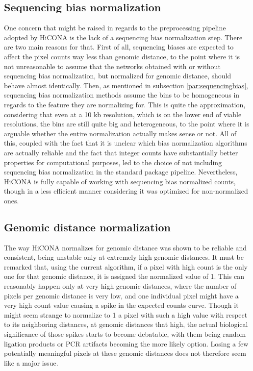 \subsection{Sequencing bias normalization}
One concern that might be raised in regards to the preprocessing pipeline adopted by HiCONA is the lack of a sequencing bias normalization step. There are two main reasons for that. First of all, sequencing biases are expected to affect the pixel counts way less than genomic distance, to the point where it is not unreasonable to assume that the networks obtained with or without sequencing bias normalization, but normalized for genomic distance, should behave almost identically. Then, as mentioned in subsection \ref{par:sequencingbias}, sequencing bias normalization methods assume the bins to be homogeneous in regards to the feature they are normalizing for. This is quite the approximation, considering that even at a 10 kb resolution, which is on the lower end of viable resolutions, the bins are still quite big and heterogeneous, to the point where it is arguable whether the entire normalization actually makes sense or not. All of this, coupled with the fact that it is unclear which bias normalization algorithms are actually reliable and the fact that integer counts have substantially better properties for computational purposes, led to the choice of not including sequencing bias normalization in the standard package pipeline. Nevertheless, 
HiCONA is fully capable of working with sequencing bias normalized counts, though in a less efficient manner considering it was optimized for non-normalized ones.

\subsection{Genomic distance normalization}
The way HiCONA normalizes for genomic distance was shown to be reliable and consistent, being unstable only at extremely high genomic distances. It must be remarked that, using the current algorithm, if a pixel with high count is the only one for that genomic distance, it is assigned the normalized value of 1. This can reasonably happen only at very high genomic distances, where the number of pixels per genomic distance is very low, and one individual pixel might have a very high count value causing a spike in the expected counts curve. Though it might seem strange to normalize to 1 a pixel with such a high value with respect to its neighboring distances, at genomic distances that high, the actual biological significance of those spikes starts to become debatable, with them being random ligation products or PCR artifacts becoming the more likely option. Losing a few potentially meaningful pixels at these genomic distances does not therefore seem like a major issue. 

